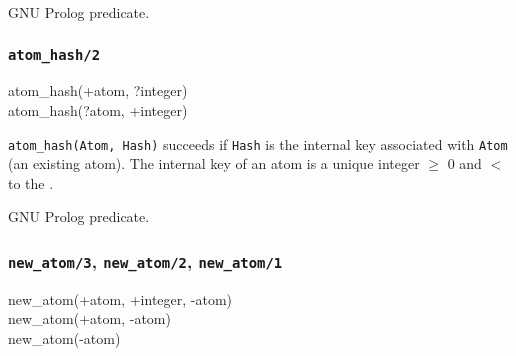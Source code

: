 \Portability

GNU Prolog predicate.

\subsubsection{\texttt{atom\_hash/2}}
\label{atom-hash/2}

\begin{TemplatesOneCol}
atom\_hash(+atom, ?integer)\\
atom\_hash(?atom, +integer)

\end{TemplatesOneCol}

\Description

\texttt{atom\_hash(Atom, Hash)} succeeds if \texttt{Hash} is the internal
key associated with \texttt{Atom} (an existing atom). The internal key of an
atom is a unique integer $\geq$ 0 and $<$ to the 
 .

\begin{PlErrors}





\end{PlErrors}

\Portability

GNU Prolog predicate.

\subsubsection{\texttt{new\_atom/3},
               \texttt{new\_atom/2},
               \texttt{new\_atom/1}}

\begin{TemplatesOneCol}
new\_atom(+atom, +integer, -atom)\\
new\_atom(+atom, -atom)\\
new\_atom(-atom)

\end{TemplatesOneCol}

